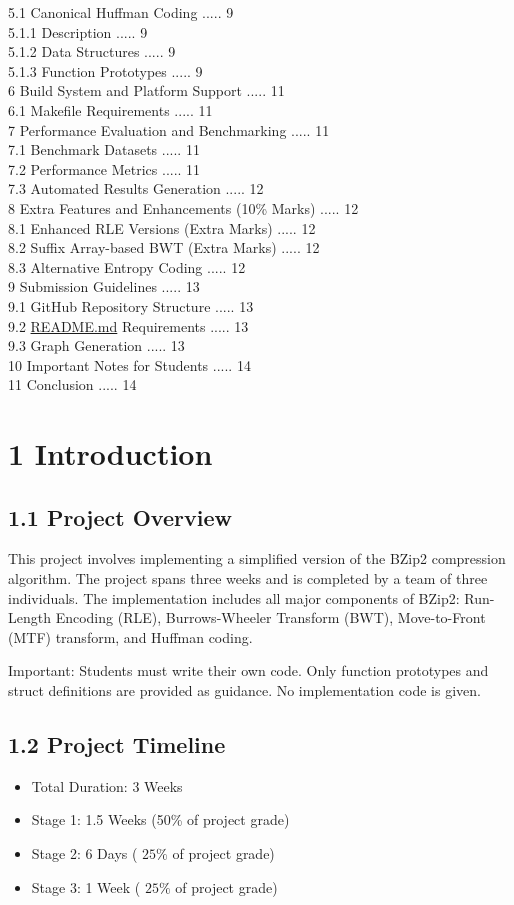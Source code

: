\documentclass[10pt]{article}
\begin{document}
5.1 Canonical Huffman Coding ..... 9\\
5.1.1 Description ..... 9\\
5.1.2 Data Structures ..... 9\\
5.1.3 Function Prototypes ..... 9\\
6 Build System and Platform Support ..... 11\\
6.1 Makefile Requirements ..... 11\\
7 Performance Evaluation and Benchmarking ..... 11\\
7.1 Benchmark Datasets ..... 11\\
7.2 Performance Metrics ..... 11\\
7.3 Automated Results Generation ..... 12\\
8 Extra Features and Enhancements (10\% Marks) ..... 12\\
8.1 Enhanced RLE Versions (Extra Marks) ..... 12\\
8.2 Suffix Array-based BWT (Extra Marks) ..... 12\\
8.3 Alternative Entropy Coding ..... 12\\
9 Submission Guidelines ..... 13\\
9.1 GitHub Repository Structure ..... 13\\
9.2 \href{http://README.md}{README.md} Requirements ..... 13\\
9.3 Graph Generation ..... 13\\
10 Important Notes for Students ..... 14\\
11 Conclusion ..... 14

\section*{1 Introduction}
\subsection*{1.1 Project Overview}
This project involves implementing a simplified version of the BZip2 compression algorithm. The project spans three weeks and is completed by a team of three individuals. The implementation includes all major components of BZip2: Run-Length Encoding (RLE), Burrows-Wheeler Transform (BWT), Move-to-Front (MTF) transform, and Huffman coding.

Important: Students must write their own code. Only function prototypes and struct definitions are provided as guidance. No implementation code is given.

\subsection*{1.2 Project Timeline}
\begin{itemize}
  \item Total Duration: 3 Weeks
  \item Stage 1: 1.5 Weeks (50\% of project grade)
  \item Stage 2: 6 Days ( $25 \%$ of project grade)
  \item Stage 3: 1 Week ( $25 \%$ of project grade)
\end{itemize}
\end{document}
